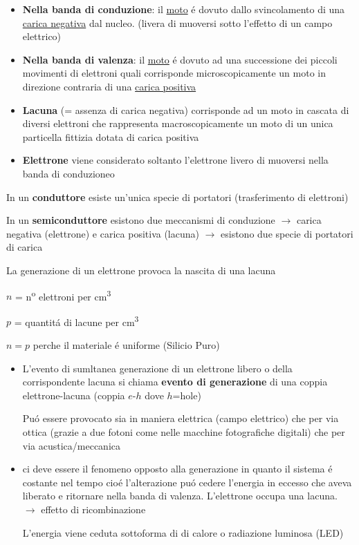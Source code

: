 \documentclass{article}
\begin{document}
\begin{itemize}
    \item \textbf{Nella banda di conduzione}: il \underline{moto} \'e dovuto dallo svincolamento di una \underline{carica negativa} dal nucleo. (livera di muoversi sotto l'effetto di un campo elettrico)

    \item \textbf{Nella banda di valenza}: il \underline{moto} \'e dovuto ad una successione dei piccoli movimenti di elettroni quali corrisponde microscopicamente un moto in direzione contraria di una \underline{carica positiva}


    \item \textbf{Lacuna} (= assenza di carica negativa) corrisponde ad un moto in cascata di diversi elettroni che rappresenta macroscopicamente un moto di un unica particella fittizia dotata di carica positiva

    \item \textbf{Elettrone} viene considerato soltanto l'elettrone livero di muoversi nella banda di conduzioneo
\end{itemize}

In un \textbf{conduttore} esiste un'unica specie di portatori (trasferimento di elettroni)

In un \textbf{semiconduttore} esistono due meccanismi di conduzione $\rightarrow$ carica negativa (elettrone) e carica positiva (lacuna) $\rightarrow$ esistono due specie di portatori di carica

La generazione di un elettrone provoca la nascita di una lacuna

$n$ = n\textsuperscript{o} elettroni per cm\textsuperscript{3}

$p$ = quantit\'a di lacune per cm\textsuperscript{3}

$n=p$ perche il materiale \'e uniforme (Silicio Puro)

\begin{itemize}
    \item L'evento di sumltanea generazione di un elettrone libero o della corrispondente lacuna si chiama \textbf{evento di generazione} di una coppia elettrone-lacuna (coppia $e$-$h$ dove $h$=hole)

        Pu\'o essere provocato sia in maniera elettrica (campo elettrico) che per via ottica (grazie a due fotoni come nelle macchine fotografiche digitali) che per via acustica/meccanica
    \item ci deve essere il fenomeno opposto alla generazione in quanto il sistema \'e costante nel tempo cio\'e l'alterazione pu\'o cedere l'energia in eccesso che aveva liberato e ritornare nella banda di valenza. L'elettrone occupa una lacuna. $\rightarrow$ effetto di ricombinazione

        L'energia viene ceduta sottoforma di di calore o radiazione luminosa (LED)
\end{itemize}
\end{document}
